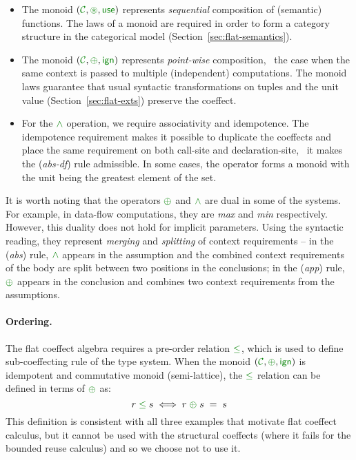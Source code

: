 \begin{itemize}
\item The monoid $(\C, \cseq, \cunit)$ represents \emph{sequential} composition of (semantic)
functions. The laws of a monoid are required in order to form a category structure in the 
categorical model (Section~\ref{sec:flat-semantics}).

\item The monoid $(\C, \cpar, \czero)$ represents \emph{point-wise} composition, \ie~the case when the
same context is passed to multiple (independent) computations. The monoid laws guarantee 
that usual syntactic transformations on tuples and the unit value (Section~\ref{sec:flat-exts})
preserve the coeffect. 

\item For the $\czip$ operation, we require associativity and idempotence. The idempotence
requirement makes it possible to duplicate the coeffects and place the same requirement on both
call-site and declaration-site, \ie~it makes the (\emph{abs-df}) rule admissible. In some cases, 
the operator forms a monoid with the unit being the greatest element of the set. 
\end{itemize}

It is worth noting that the operators $\cpar$ and $\czip$ are dual in some of the systems. For 
example, in data-flow computations, they are \emph{max} and \emph{min} respectively. However, this
duality does not hold for implicit parameters. Using the syntactic reading, they represent 
\emph{merging} and \emph{splitting} of context requirements -- in the (\emph{abs}) rule, 
$\czip$ appears in the assumption and the combined context requirements of the body are split 
between two positions in the conclusions; in the (\emph{app}) rule, $\cpar$ appears in the 
conclusion and combines two context requirements from the assumptions.

\paragraph{Ordering.}

The flat coeffect algebra requires a pre-order relation $\cleq$, which is used to define 
sub-coeffecting rule of the type system. When the monoid $(\C, \cpar, \czero)$ is idempotent
and commutative monoid (semi-lattice), the $\cleq$ relation can be defined in terms of $\cpar$ as:
%
\begin{equation*}
r \;\cleq\; s \;\Longleftrightarrow\; r \;\cpar\; s \;=\; s
\end{equation*}
%
This definition is consistent with all three examples that motivate flat coeffect calculus, but
it cannot be used with the structural coeffects (where it fails for the bounded reuse 
calculus) and so we choose not to use it.

